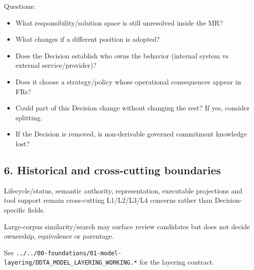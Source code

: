 \documentclass[
  10pt,
]{article}
\providecommand{\tightlist}{%
  \setlength{\itemsep}{0pt}\setlength{\parskip}{0pt}}
\begin{document}
Questions:

\begin{itemize}
\tightlist
\item
  What responsibility/solution space is still unresolved inside the MR?
\item
  What changes if a different position is adopted?
\item
  Does the Decision establish who owns the behavior (internal system vs
  external service/provider)?
\item
  Does it choose a strategy/policy whose operational consequences appear
  in FRs?
\item
  Could part of this Decision change without changing the rest? If yes,
  consider splitting.
\item
  If the Decision is removed, is non-derivable governed commitment
  knowledge lost?
\end{itemize}

\subsection{6. Historical and cross-cutting
boundaries}\label{6-historical-and-cross-cutting-boundaries}

Lifecycle/status, semantic authority, representation, executable
projections and tool support remain cross-cutting L1/L2/L3/L4 concerns
rather than Decision-specific fields.

Large-corpus similarity/search may surface review candidates but does
not decide ownership, equivalence or parentage.

See
\texttt{../../00-foundations/01-model-layering/DDTA\_MODEL\_LAYERING\_WORKING.*}
for the layering contract.
\end{document}
